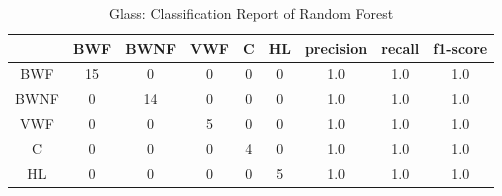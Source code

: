 \documentclass[english]{tktltiki2}
\theoremstyle{definition}
\theoremstyle{remark}
\begin{document}
\begin{table}[H]
	\begin{center}
		\caption{Glass: Classification Report of Random Forest}
		\label{tab:quantitative_experimentation_rf_glass_report}
		\begin{tabular}{@{}ccccccccc@{}}
			\toprule
			&  BWF & BWNF & VWF & C & HL & precision & recall & f1-score \\ \hline
			\multicolumn{1}{|c|}{BWF} & \multicolumn{1}{c|}{15} & \multicolumn{1}{c|}{0} & \multicolumn{1}{c|}{0} & \multicolumn{1}{c|}{0} & \multicolumn{1}{c|}{0} & \multicolumn{1}{c|}{1.0} & \multicolumn{1}{c|}{1.0} & \multicolumn{1}{c|}{1.0} \\ \hline
			
			\multicolumn{1}{|c|}{BWNF} & \multicolumn{1}{c|}{0} & \multicolumn{1}{c|}{14} & \multicolumn{1}{c|}{0} & \multicolumn{1}{c|}{0} & \multicolumn{1}{c|}{0} & \multicolumn{1}{c|}{1.0} & \multicolumn{1}{c|}{1.0} & \multicolumn{1}{c|}{1.0} \\ \hline
			
			\multicolumn{1}{|c|}{VWF} & \multicolumn{1}{c|}{0} & \multicolumn{1}{c|}{0} & \multicolumn{1}{c|}{5} & \multicolumn{1}{c|}{0} & \multicolumn{1}{c|}{0} & \multicolumn{1}{c|}{1.0} & \multicolumn{1}{c|}{1.0} & \multicolumn{1}{c|}{1.0} \\ \hline
			
			\multicolumn{1}{|c|}{C} & \multicolumn{1}{c|}{0} & \multicolumn{1}{c|}{0} & \multicolumn{1}{c|}{0} & \multicolumn{1}{c|}{4} & \multicolumn{1}{c|}{0} & \multicolumn{1}{c|}{1.0} & \multicolumn{1}{c|}{1.0} & \multicolumn{1}{c|}{1.0} \\ \hline
			
			\multicolumn{1}{|c|}{HL} & \multicolumn{1}{c|}{0} & \multicolumn{1}{c|}{0} & \multicolumn{1}{c|}{0} & \multicolumn{1}{c|}{0} & \multicolumn{1}{c|}{5} & \multicolumn{1}{c|}{1.0} & \multicolumn{1}{c|}{1.0} & \multicolumn{1}{c|}{1.0} \\ \hline
		\end{tabular}
	\end{center}
\end{table}
\end{document}
